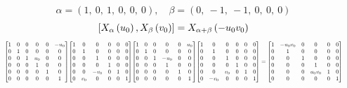 \documentclass[11pt]{article}
\theoremstyle{definition}
\begin{document}
\[
\alpha = \left( 1, \  0, \  1, \  0, \  0, \  0\right), \quad \beta = \left( 0, \  -1, \  -1, \  0, \  0, \  0\right)
\]
\[
\scaletoalign{\textwidth}{\left[ X_{\alpha}\left(u_{0}\right), X_{\beta}\left(v_{0}\right) \right] = X_{\alpha + \beta}\left(- u_{0} v_{0}\right)}
\]
\[
\scaletoalign{\textwidth}{{\left[\begin{matrix}1 & 0 & 0 & 0 & 0 & - u_{0}\\0 & 1 & 0 & 0 & 0 & 0\\0 & 0 & 1 & u_{0} & 0 & 0\\0 & 0 & 0 & 1 & 0 & 0\\0 & 0 & 0 & 0 & 1 & 0\\0 & 0 & 0 & 0 & 0 & 1\end{matrix}\right]} {\left[\begin{matrix}1 & 0 & 0 & 0 & 0 & 0\\0 & 1 & 0 & 0 & 0 & 0\\0 & 0 & 1 & 0 & 0 & 0\\0 & 0 & 0 & 1 & 0 & 0\\0 & 0 & - v_{0} & 0 & 1 & 0\\0 & v_{0} & 0 & 0 & 0 & 1\end{matrix}\right]} {\left[\begin{matrix}1 & 0 & 0 & 0 & 0 & u_{0}\\0 & 1 & 0 & 0 & 0 & 0\\0 & 0 & 1 & - u_{0} & 0 & 0\\0 & 0 & 0 & 1 & 0 & 0\\0 & 0 & 0 & 0 & 1 & 0\\0 & 0 & 0 & 0 & 0 & 1\end{matrix}\right]} {\left[\begin{matrix}1 & 0 & 0 & 0 & 0 & 0\\0 & 1 & 0 & 0 & 0 & 0\\0 & 0 & 1 & 0 & 0 & 0\\0 & 0 & 0 & 1 & 0 & 0\\0 & 0 & v_{0} & 0 & 1 & 0\\0 & - v_{0} & 0 & 0 & 0 & 1\end{matrix}\right]} = {\left[\begin{matrix}1 & - u_{0} v_{0} & 0 & 0 & 0 & 0\\0 & 1 & 0 & 0 & 0 & 0\\0 & 0 & 1 & 0 & 0 & 0\\0 & 0 & 0 & 1 & 0 & 0\\0 & 0 & 0 & u_{0} v_{0} & 1 & 0\\0 & 0 & 0 & 0 & 0 & 1\end{matrix}\right]}}
\]
\end{document}
